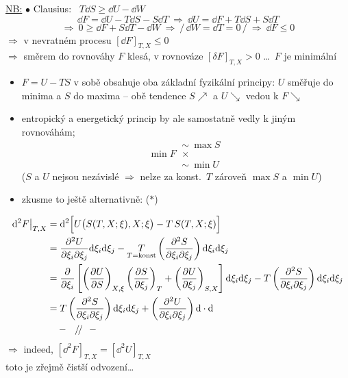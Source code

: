 \underline{NB:} $\bullet$ Clausius: \ $T\dd S\geq\dd U - \dd W$
\[
  \dd F = \dd U - T\dd S - S\dd T \ \Rightarrow\ \dd U = \dd F + T\dd S + S\dd T
\]
\[
  \Rightarrow\ 0\geq\dd F + S\dd T - \dd W \ \Rightarrow\ \big/\,\dd W = \dd T = 0\,\big/ \ \Rightarrow\ \dd F\leq 0
\]
$\Rightarrow$ v nevratném procesu $[\dd F]_{T,X}\leq 0$ \\
$\Rightarrow$ směrem do rovnováhy $F$ klesá, v rovnováze $[\delta F]_{T,X} > 0$ \dots\ $F$ je minimální

\begin{itemize}
  \item $F = U - TS$ v sobě obsahuje oba základní fyzikální principy: $U$ směřuje do minima a $S$ do maxima -- obě tendence $S\nearrow$ a $U\searrow$ vedou k $F\searrow$
  \item entropický a energetický princip by ale samostatně vedly k jiným rovnováhám;
  \[
    \min F\ \begin{array}{l}\sim\ \max S \\ \times \\ \sim\ \min U\end{array}
  \]
  ($S$ a $U$ nejsou nezávislé $\Rightarrow$ nelze za konst.\ $T$ zároveň $\max S$ a $\min U$)
\end{itemize}

\textcolor{NavyBlue}{
\begin{itemize}
  \item zkusme to ještě alternativně: ($\ast$)
\end{itemize}
\begin{align*}
  \dd^2F\big|_{T,X} &= \dd^2\Big[U\big(S(T,X;\xi),X;\xi\big) - T\,S(T,X;\xi)\Big] \\
  &= \frac{\partial^2U}{\partial\xi_i\partial\xi_j}\dd\xi_i\dd\xi_j - \underset{T = \text{konst}}{T}\left(\frac{\partial^2S}{\partial\xi_i\partial\xi_j}\right)\dd\xi_i\dd\xi_j \\
  &= \pdv{\xi_i}\left[\left(\pdv{U}{S}\right)_{X,\xi}\left(\pdv{S}{\xi_j}\right)_T + \left(\pdv{U}{\xi_j}\right)_{S,X}\right]\dd\xi_i\dd\xi_j
     - T\left(\frac{\partial^2S}{\partial\xi_i\partial\xi_j}\right)\dd\xi_i\dd\xi_j \\
  &= T\left(\frac{\partial^2S}{\partial\xi_i\partial\xi_j}\right)\dd\xi_i\dd\xi_j + \left(\frac{\partial^2U}{\partial\xi_i\partial\xi_j}\right)\dd\cdot\dd \\
  &\quad - \ \ /\!/\ \ -
\end{align*}
$\Rightarrow$ indeed, $[\dd^2F]_{T,X} = [\dd^2U]_{T,X}$ \ \checkmark \\
toto je zřejmě čistší odvození\dots}

